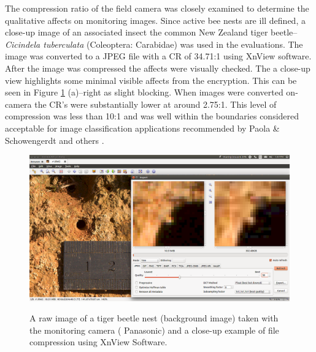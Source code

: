 The compression ratio of the field camera was closely examined to determine the qualitative affects on monitoring images. Since active bee nests are ill defined, a close-up image of an associated insect
the common New Zealand tiger beetle--\emph{Cicindela tuberculata} (Coleoptera: Carabidae) was used in the evaluations. The image was converted to a JPEG file with a CR of 34.71:1 using XnView software. After the image was compressed the affects were visually checked. The a close-up view highlights some minimal visible affects from the encryption. This can be seen in Figure \ref{fig:Image_quality} (a)--right as slight blocking. When images were converted on-camera the CR's were substantially lower at around 2.75:1. This level of compression was less than 10:1 and was well within the boundaries considered acceptable for image classification applications recommended by Paola \& Schowengerdt \cite{Paola1995} and others \cite{Lam2001, Zabala2011}.


\begin{figure}[!htbp]\myfloatalign
\includegraphics[width=0.9\linewidth]{gfx7/raw_tiffjpg}\\
\caption[Image quality and preparation for analysis.] {A raw image of a tiger beetle nest (background image) taken with the monitoring camera ( Panasonic) and a close-up example of file compression using XnView Software.} \label{fig:Image_quality}
\end{figure}

